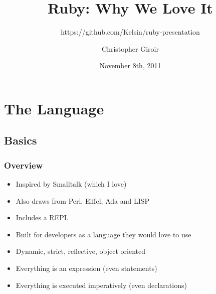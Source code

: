 \usepackage{color}
\usepackage{float}
\usepackage{minted}



\usepackage{beamerthemesplit}


\title{Ruby: Why We Love It}
\subtitle{https://github.com/Kelsin/ruby-presentation}
\author{Christopher Giroir}
\date{November 8th, 2011}




\maketitle

\begin{frame}
  \titlepage
\end{frame}

\begin{frame}
  \tableofcontents
\end{frame}

\section{The Language}

\subsection{Basics}

\begin{frame}
  \frametitle{Overview}
  \begin{itemize}
  \item Inspired by Smalltalk (which I love)
  \pause
  \item Also draws from Perl, Eiffel, Ada and LISP
  \pause
  \item Includes a REPL
  \pause
  \item Built for developers as a language they would love to use
  \pause
  \item Dynamic, strict, reflective, object oriented
  \pause
  \item Everything is an expression (even statements)
  \pause
  \item Everything is executed imperatively (even declarations)
  \end{itemize}
\end{frame}

